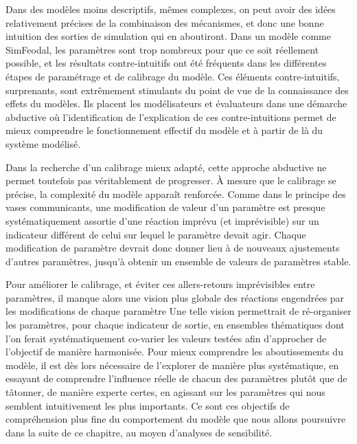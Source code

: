 Dans des modèles moins descriptifs, mêmes complexes, on peut avoir des idées relativement précises de la combinaison des mécanismes, et donc une bonne intuition des sorties de simulation qui en aboutiront.
Dans un modèle comme SimFeodal, les paramètres sont trop nombreux pour que ce soit réellement possible, et les résultats contre-intuitifs ont été fréquents dans les différentes étapes de paramétrage et de calibrage du modèle.
Ces éléments contre-intuitifs, surprenants, sont extrêmement stimulants du point de vue de la connaissance des effets du modèles.
Ils placent les modélisateurs et évaluateurs dans une démarche abductive où l'identification de l'explication de ces contre-intuitions permet de mieux comprendre le fonctionnement effectif du modèle et à partir de là du système modélisé.

Dans la recherche d'un calibrage mieux adapté, cette approche abductive ne permet toutefois pas véritablement de progresser.
À mesure que le calibrage se précise, la complexité du modèle apparaît renforcée.
Comme dans le principe des vases communicants, une modification de valeur d'un paramètre est presque systématiquement assortie d'une réaction imprévu (et imprévisible) sur un indicateur différent de celui sur lequel le paramètre devait agir.
Chaque modification de paramètre devrait donc donner lieu à de nouveaux ajustements d'autres paramètres, jusqu'à obtenir un ensemble de valeurs de paramètres stable.

Pour améliorer le calibrage, et éviter ces allers-retours imprévisibles entre paramètres, il manque alors une vision plus globale des réactions engendrées par les modifications de chaque paramètre
Une telle vision permettrait de ré-organiser les paramètres, pour chaque indicateur de sortie, en ensembles thématiques dont l'on ferait systématiquement co-varier les valeurs testées afin d'approcher de l'objectif de manière harmonisée.
Pour mieux comprendre les aboutissements du modèle, il est dès lors nécessaire de l'explorer de manière plus systématique, en essayant de comprendre l'influence réelle de chacun des paramètres plutôt que de tâtonner, de manière experte certes, en agissant sur les paramètres qui nous semblent intuitivement les plus importants.
Ce sont ces objectifs de compréhension plus fine du comportement du modèle que nous allons poursuivre dans la suite de ce chapitre, au moyen d'analyses de sensibilité.


